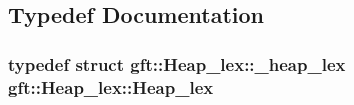 \subsection{Typedef Documentation}
\hypertarget{namespacegft_1_1Heap__lex_ad75bb201b66a6623842b22d41ae1d473}{
\subsubsection[{Heap\-\_\-lex}]{\setlength{\rightskip}{0pt plus 5cm}typedef struct {\bf gft\-::\-Heap\-\_\-lex\-::\-\_\-heap\-\_\-lex}  {\bf gft\-::\-Heap\-\_\-lex\-::\-Heap\-\_\-lex}}}\label{namespacegft_1_1Heap__lex_ad75bb201b66a6623842b22d41ae1d473}


